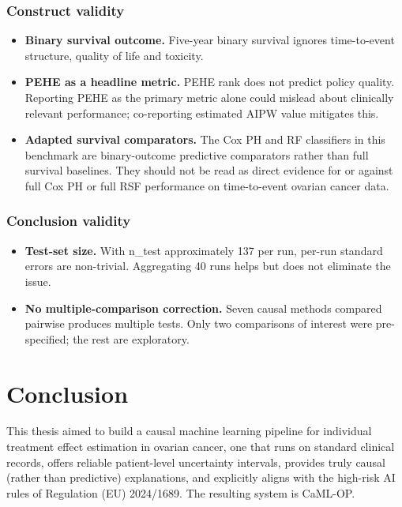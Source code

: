 \subsection{Construct validity}\label{construct-validity}

\begin{itemize}
\item
 \textbf{Binary survival outcome.} Five-year binary survival ignores time-to-event structure, quality of life and toxicity.
\item
 \textbf{PEHE as a headline metric.} PEHE rank does not predict policy quality. Reporting PEHE as the primary metric alone could mislead about clinically relevant performance; co-reporting estimated AIPW value mitigates this.
\item
 \textbf{Adapted survival comparators.} The Cox PH and RF classifiers in this benchmark are binary-outcome predictive comparators rather than full survival baselines. They should not be read as direct evidence for or against full Cox PH or full RSF performance on time-to-event ovarian cancer data.
\end{itemize}

\subsection{Conclusion validity}\label{conclusion-validity}

\begin{itemize}
\item
 \textbf{Test-set size.} With n\_test approximately 137 per run, per-run standard errors are non-trivial. Aggregating 40 runs helps but does not eliminate the issue.
\item
 \textbf{No multiple-comparison correction.} Seven causal methods compared pairwise produces multiple tests. Only two comparisons of interest were pre-specified; the rest are exploratory.
\end{itemize}

\chapter{Conclusion}\label{conclusion}

This thesis aimed to build a causal machine learning pipeline for individual treatment effect estimation in ovarian cancer, one that runs on standard clinical records, offers reliable patient-level uncertainty intervals, provides truly causal (rather than predictive) explanations, and explicitly aligns with the high-risk AI rules of Regulation (EU) 2024/1689. The resulting system is CaML-OP.

